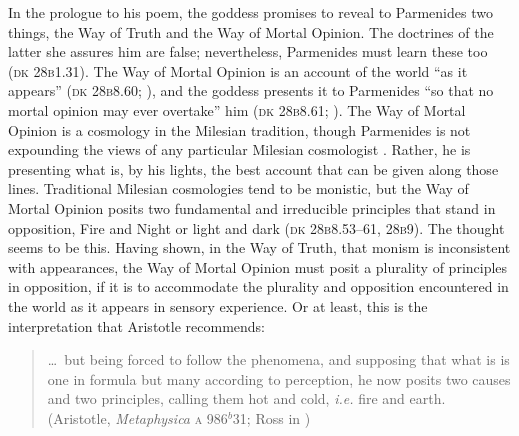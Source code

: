 In the prologue to his poem, the goddess promises to reveal to Parmenides two things, the Way of Truth and the Way of Mortal Opinion. The doctrines of the latter she assures him are false; nevertheless, Parmenides must learn these too (\textsc{dk} 28\textsc{b}1.31). The Way of Mortal Opinion is an account of the world ``as it appears'' (\textsc{dk} 28\textsc{b}8.60; \citealt[155]{McKirahan:1994ve}), and the goddess presents it to Parmenides ``so that no mortal opinion may ever overtake'' him (\textsc{dk} 28\textsc{b}8.61; \citealt[155]{McKirahan:1994ve}). The Way of Mortal Opinion is a cosmology in the Milesian tradition, though Parmenides is not expounding the views of any particular Milesian cosmologist \citep[on Parmenides and Milesian cosmology see][]{Kahn:1994qf}. Rather, he is presenting what is, by his lights, the best account that can be given along those lines. Traditional Milesian cosmologies tend to be monistic, but the Way of Mortal Opinion posits two fundamental and irreducible principles that stand in opposition, Fire and Night or light and dark (\textsc{dk} 28\textsc{b}8.53--61, 28\textsc{b}9). The thought seems to be this. Having shown, in the Way of Truth, that monism is inconsistent with appearances, the Way of Mortal Opinion must posit a plurality of principles in opposition, if it is to accommodate the plurality and opposition encountered in the world as it appears in sensory experience. Or at least, this is the interpretation that Aristotle recommends:
\begin{quote}
    \ldots\ but being forced to follow the phenomena, and supposing that what is is one in formula but many according to perception, he now posits two causes and two principles, calling them hot and cold, \emph{i.e.} fire and earth. (Aristotle, \emph{Metaphysica} \textsc{a} 986\( ^{b} \)31; Ross in \citealt[12]{Barnes:1984kx})
\end{quote}

